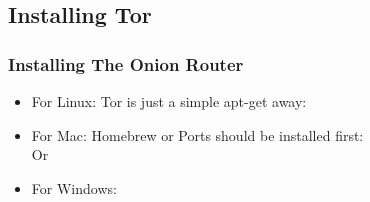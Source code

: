 \documentclass{beamer}
\begin{document}
\subsection{Installing Tor}
\begin{frame}
\frametitle{Installing The Onion Router}
\begin{itemize}
\item For Linux: Tor is just a simple apt-get away:\\
\pause
{\color{blue}{sudo apt-get install tor}}
\pause
\item For Mac: Homebrew or Ports should be installed first:\\
\pause{\color{blue}{brew install tor}} Or {\color{blue}{ports install tor}}
\pause
\item For Windows:
\pause
{\color{red}{You're on your own...}}

\end{itemize}
\end{frame}
\end{document}
